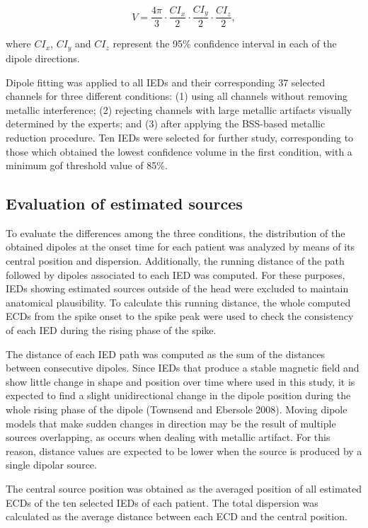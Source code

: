 \begin{equation} \label{eq:2-3}
V = \frac{4\pi}{3} \cdot \frac{CI_x}{2} \cdot \frac{CI_y}{2} \cdot \frac{CI_z}{2}, 
\end{equation}

where $CI_x$, $CI_y$ and $CI_z$ represent the 95\% confidence interval in each of the dipole directions. 

Dipole fitting was applied to all IEDs and their corresponding 37 selected channels for three different conditions: (1) using all channels without removing metallic interference; (2) rejecting channels with large metallic artifacts visually determined by the experts; and (3) after applying the BSS-based metallic reduction procedure. Ten IEDs were selected for further study, corresponding to those which obtained the lowest confidence volume in the first condition, with a minimum gof threshold value of 85\%.

\subsection{Evaluation of estimated sources}

To evaluate the differences among the three conditions, the distribution of the obtained dipoles at the onset time for each patient was analyzed by means of its central position and dispersion. Additionally, the running distance of the path followed by dipoles associated to each IED was computed. For these purposes, IEDs showing estimated sources outside of the head were excluded to maintain anatomical plausibility. To calculate this running distance, the whole computed ECDs from the spike onset to the spike peak were used to check the consistency of each IED during the rising phase of the spike.

The distance of each IED path was computed as the sum of the distances between consecutive dipoles. Since IEDs that produce a stable magnetic field and show little change in shape and position over time where used in this study, it is expected to find a slight unidirectional change in the dipole position during the whole rising phase of the dipole \citep{Townsend2008}(Townsend and Ebersole 2008). Moving dipole models that make sudden changes in direction may be the result of multiple sources overlapping, as occurs when dealing with metallic artifact. For this reason, distance values are expected to be lower when the source is produced by a single dipolar source.

The central source position was obtained as the averaged position of all estimated ECDs of the ten selected IEDs of each patient. The total dispersion was calculated as the average distance between each ECD and the central position.

